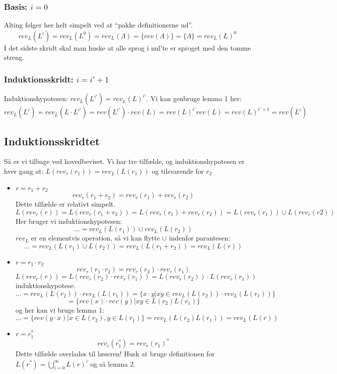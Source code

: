 \documentclass[11pt,a4paper]{article}
\begin{document}
\subsubsection{Basis: $i=0$}
Alting følger her helt simpelt ved at ``pakke definitionerne ud''.
\[rev_L(L^i)=rev_L(L^0)=rev_L({\Lambda})=\{rev(\Lambda)\}=\{\Lambda\}=
rev_L(L)^0\]
I det sidste skridt skal man huske at alle sprog i nul'te er sproget med den tomme streng.
\subsubsection{Induktionsskridt: $i = i'+1$}
Induktionshypotesen: $rev_L(L^{i'}) = rev_L(L)^{i'}$. Vi kan genbruge lemma 1 her:
\[rev_L(L^i)=rev_L(L\cdot L^{i'}) = rev(L^{i'})\cdot rev(L) = rev(L)^{i'}rev(L)=
rev(L)^{i'+1} = rev(L^{i})\]
\subsection{Induktionsskridtet}
Så er vi tilbage ved hovedbeviset. Vi har tre tilfælde, og
induktionshypotesen er hver gang at: $L(rev_r(r_1)) = rev_L(L(r_1))$
og tilsvarende for $r_2$
\begin{itemize}
\item $r = r_1 + r_2$
\[rev_r(r_1 + r_2) = rev_r(r_1) + rev_r(r_2)\]
Dette tilfælde er relativt simpelt.
\[L(rev_r(r))=L(rev_r(r_1+r_2))=L(rev_r(r_1)+rev_r(r_2)) = L(rev_r(r_1))\cup L(rev_r(r2))\]
Her bruger vi induktionshypotesen:
\[\ldots = rev_L(L(r_1)) \cup rev_L(L(r_2))\]
$rev_L$ er en elementvis operation, så vi kan flytte $\cup$ indenfor parantesen:
\[\ldots = rev_L(L(r_1)\cup L(r_2)) = rev_L(L(r_1+r_2)) = rev_L(L(r))\]
\item $r = r_1\cdot r_2$
\[rev_r(r_1 \cdot r_2) = rev_r(r_2) \cdot rev_r(r_1)\]
\[L(rev_r(r)) = L(rev_r(r_2)\cdot rev_r(r_1)) = L(rev_r(r_2)) \cdot L(rev_r(r_1))\]
induktionshypotese:
\[\ldots = rev_L(L(r_2))\cdot rev_L(L(r_1)) = \{x\cdot y | xy \in rev_L(L(r_2))\cdot rev_L(L(r_1))\} \]
\[= \{rev(x)\cdot rev(y) | xy \in  L(r_2)L(r_1)\}\]
og her kan vi bruge lemma 1:
\[\ldots = \{rev(y\cdot x) | x\in L(r_2), y \in  L(r_1)\} = rev_L(L(r_2)L(r_1)) = rev_L(L(r))\]
\item $r = r_1^*$
  \[rev_r(r_1^*) = rev_r(r_1)^*\] Dette tilfælde overlades til læseren!
  Husk at bruge definitionen for $L(r^*)=\bigcup_{i=0}^{\infty}L(r)^i$
  og så lemma 2.
\end{itemize}
\end{document}
